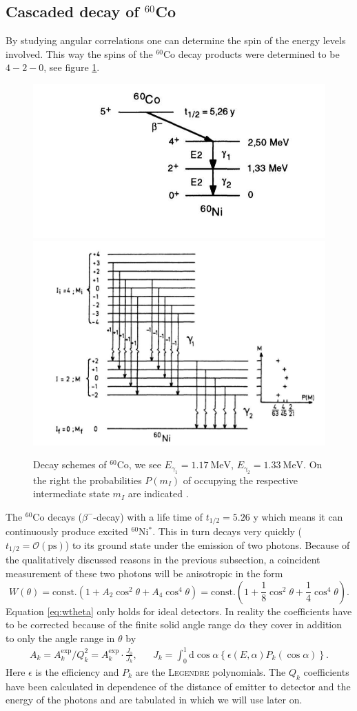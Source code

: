 \documentclass[11pt,a4paper,notitlepage]{scrartcl}
\begin{document}
\subsection{Cascaded decay of $^{60}$Co}
By studying angular correlations one can determine the spin of the energy levels involved. This way the spins of the $^{60}$Co decay products were determined \cite{siegbahn} to be $4-2-0$, see figure \ref{fig:Decay}.
\begin{figure}[htbp]
	\centering
	\includegraphics[width=.49\linewidth]{figs/decay}
	\includegraphics[width=.49\linewidth]{figs/decay_scheme}
	\caption{Decay schemes of $^{60}$Co, we see $E_{\gamma_1}=\SI{1.17}{\mega\eV}$, $E_{\gamma_2}=\SI{1.33}{\mega\eV}$. On the right the probabilities $P(m_I)$ of occupying the respective intermediate state $m_I$ are indicated \cite{nuclear}.}\label{fig:Decay}
\end{figure}
The $^{60}$Co decays ($\beta^-$-decay) with a life time of $t_{1/2}=5.26$ y which means it can continuously produce excited $^{60}$Ni$^*$. This in turn decays very quickly ($t_{1/2}=\mathcal{O}(\si{\pico\s})$) to its ground state under the emission of two photons. Because of the qualitatively discussed reasons in the previous subsection, a coincident measurement of these two photons will be anisotropic in the form \cite{nuclear}\begin{equation}
	W(\theta)=\text{const.}\left(1+A_2\cos^2\theta+A_4\cos^4\theta\right)=\text{const.}\left(1+\frac{1}{8}\cos^2\theta+\frac{1}{4}\cos^4\theta\right).
	\label{eq:wtheta}
\end{equation}
Equation \ref{eq:wtheta} only holds for ideal detectors. In reality the coefficients have to be corrected because of the finite solid angle range d$\alpha$ they cover in addition to only the angle range in $\theta$ by \cite{siegbahn} \begin{align}
	A_k=A_k^{\text{exp}}/Q_k^2=A_k^{\text{exp}}\cdot\frac{J_0}{J_k}, && J_k=\int_0^{1}\text{d}\cos\alpha\left\{\epsilon(E,\alpha)P_k(\cos\alpha)\right\}.
\end{align} Here $\epsilon$ is the efficiency and $P_k$ are the \textsc{Legendre} polynomials. The $Q_k$ coefficients have been calculated in dependence of the distance of emitter to detector and the energy of the photons and are tabulated in \cite{siegbahn} which we will use later on.
\end{document}
